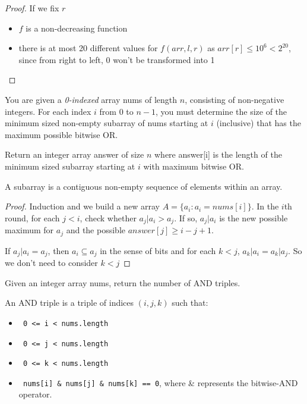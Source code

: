 \documentclass[11pt]{article}
\let\OldTexttt\texttt
\renewcommand{\texttt}[1]{\OldTexttt{\color{MidnightBlue} #1}}
\begin{document}
\begin{proof}
If we fix \(r\)
\begin{itemize}
\item \(f\) is a non-decreasing function
\item there is at most 20 different values for \(f(arr,l,r)\) as \(arr[r]\le 10^6<2^{20}\), since from
right to left, 0 won't be transformed into 1
\end{itemize}
\end{proof}

\begin{problem}
You are given a \emph{0-indexed} array nums of length \(n\), consisting of non-negative integers. For
each index \(i\) from 0 to \(n-1\), you must determine the size of the minimum sized non-empty
subarray of nums starting at \(i\) (inclusive) that has the maximum possible bitwise OR.

Return an integer array answer of size \(n\) where answer[i] is the length of the minimum sized subarray
starting at \(i\) with maximum bitwise OR.

A subarray is a contiguous non-empty sequence of elements within an array.
\end{problem}

\begin{proof}
Induction and we build a new array \(A=\{a_i:a_i=nums[i]\}\). In the \(i\)th round, for
each \(j<i\), check whether \(a_j|a_i>a_j\). If so, \(a_j|a_i\) is the new possible maximum
for \(a_j\) and the possible \(answer[j]\ge i-j+1\).

If \(a_j|a_i=a_j\), then \(a_i\subseteq a_j\) in the sense of bits and for
each \(k<j\), \(a_k|a_i=a_k|a_j\). So we don't need to consider \(k<j\)
\end{proof}

\begin{problem}
Given an integer array nums, return the number of AND triples.

An AND triple is a triple of indices \((i, j, k)\) such that:
\begin{itemize}
\item \texttt{0 <= i < nums.length}
\item \texttt{0 <= j < nums.length}
\item \texttt{0 <= k < nums.length}
\item \texttt{nums[i] \& nums[j] \& nums[k] == 0}, where \& represents the bitwise-AND operator.
\end{itemize}
\end{problem}
\end{document}
